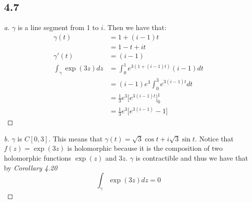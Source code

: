 \documentclass[a4paper, 11pt]{article}
\begin{document}
\subsection*{4.7}
	\begin{proof}[a]
		$\gamma$ is a line segment from 1 to $i$. Then we have that: 	
			\begin{align*}
				\gamma(t) &= 1+(i-1)t \\ 
					&= 1-t + it \\ 
				\gamma'(t) &= (i-1) \\ 
				\int_\gamma \exp(3z)dz &= \int_0^1 e^{3(1+(i-1)t)}(i-1)dt \\ 
					&= (i-1)e^3\int_0^3 e^{3(i-1)t}dt \\ 
					&= \frac{1}{3}e^3\Big[e^{3(i-1)t}\Big]_0^1 \\ 
					&= \frac{1}{3}e^3\Big[e^{3(i-1)}-1\Big]
			\end{align*}
	\end{proof}



	\begin{proof}[b]
		$\gamma$ is $C[0,3]$. This means that $\gamma(t) = \sqrt{3}\cos t + i \sqrt{3}\sin t$. Notice that $f(z) = \exp(3z)$ is holomorphic because it is the composition of two holomorphic functions $\exp(z)$ and $3z$. $\gamma$ is contractible and thus we have that by \textit{Corollary 4.20} 	
			\begin{equation*}
				\int_\gamma \exp(3z)dz = 0 
			\end{equation*}
	\end{proof}
\end{document}
